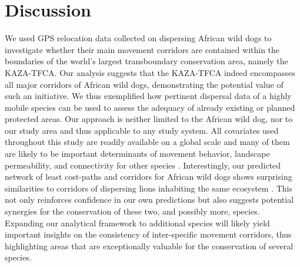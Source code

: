\documentclass[abstract=on,10pt,a4paper,bibliography=totocnumbered]{article}
\begin{document}
\section{Discussion}
We used GPS relocation data collected on dispersing African wild dogs to
investigate whether their main movement corridors are contained within the
boundaries of the world's largest transboundary conservation area, namely the
KAZA-TFCA. Our analysis suggests that the KAZA-TFCA indeed encompasses all major
corridors of African wild dogs, demonstrating the potential value of such an
initiative. We thus exemplified how pertinent dispersal data of a highly mobile
species can be used to assess the adequacy of already existing or planned
protected areas. Our approach is neither limited to the African wild dog, nor to
our study area and thus applicable to any study system. All covariates used
throughout this study are readily available on a global scale and many of them
are likely to be important determinants of movement behavior, landscape
permeability, and connectivity for other species \citep{Thurfjell.2014,
Zeller.2012}. Interestingly, our predicted network of least cost-paths and
corridors for African wild dogs shows surprising similarities to corridors of
dispersing lions inhabiting the same ecosystem \citep{Elliot.2014,
Cushman.2018}. This not only reinforces confidence in our own predictions but
also suggests potential synergies for the conservation of these two, and
possibly more, species. Expanding our analytical framework to additional species
will likely yield important insights on the consistency of inter-specific
movement corridors, thus highlighting areas that are exceptionally valuable for
the conservation of several species.
\end{document}

